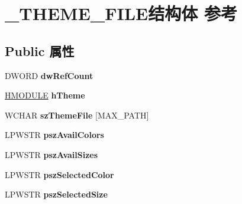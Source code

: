 \hypertarget{struct___t_h_e_m_e___f_i_l_e}{}\section{\+\_\+\+T\+H\+E\+M\+E\+\_\+\+F\+I\+L\+E结构体 参考}
\label{struct___t_h_e_m_e___f_i_l_e}
\subsection*{Public 属性}
\begin{DoxyCompactItemize}
\item 
\mbox{\label{struct___t_h_e_m_e___f_i_l_e_a69b3bf1ec1ef9e73c1080e32e0f88946}} 
D\+W\+O\+RD {\bfseries dw\+Ref\+Count}
\item 
\mbox{\label{struct___t_h_e_m_e___f_i_l_e_a3e623707b96509bc9fab826c3c7fb93d}} 
\hyperlink{interfacevoid}{H\+M\+O\+D\+U\+LE} {\bfseries h\+Theme}
\item 
\mbox{\label{struct___t_h_e_m_e___f_i_l_e_a0d0ac8c49e8bebf2c8dfc7291738fcff}} 
W\+C\+H\+AR {\bfseries sz\+Theme\+File} \mbox{[}M\+A\+X\+\_\+\+P\+A\+TH\mbox{]}
\item 
\mbox{\label{struct___t_h_e_m_e___f_i_l_e_a1f6f720a9c6e7c19804eb514f3a525de}} 
L\+P\+W\+S\+TR {\bfseries psz\+Avail\+Colors}
\item 
\mbox{\label{struct___t_h_e_m_e___f_i_l_e_aa949d52fbddc40b59ab2902bb50842ff}} 
L\+P\+W\+S\+TR {\bfseries psz\+Avail\+Sizes}
\item 
\mbox{\label{struct___t_h_e_m_e___f_i_l_e_ad21bdad4865c96d31b4789a66732c841}} 
L\+P\+W\+S\+TR {\bfseries psz\+Selected\+Color}
\item 
\mbox{\label{struct___t_h_e_m_e___f_i_l_e_a75fec031ca637daf05c61a2c7678cb02}} 
L\+P\+W\+S\+TR {\bfseries psz\+Selected\+Size}
\item 
\mbox{\label{struct___t_h_e_m_e___f_i_l_e_a9ea64fda9e13545841f3cd436b8d279b}} 

\end{DoxyCompactItemize}
